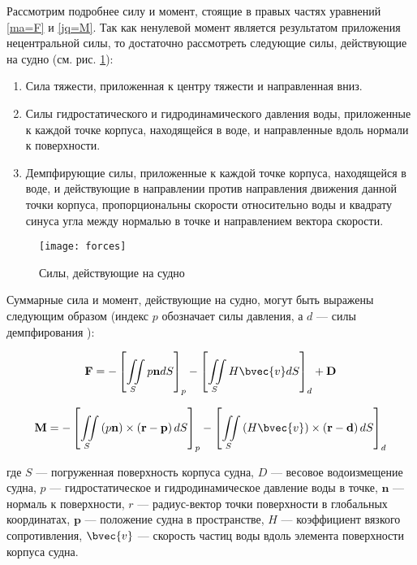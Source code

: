 Рассмотрим подробнее силу и момент, стоящие в правых частях уравнений \eqref{ma=F} и \eqref{jq=M}. 
Так как ненулевой момент является результатом приложения нецентральной силы, то достаточно рассмотреть следующие силы, действующие на судно (см. рис. \ref{boat_forces}):
\begin{enumerate}
	\item	Сила тяжести, приложенная к центру тяжести и 
			направленная вниз.
	\item	Силы гидростатического и гидродинамического давления воды, приложенные к каждой точке корпуса, 
			находящейся в воде, и направленные вдоль нормали к поверхности.
	\item	Демпфирующие силы, приложенные к каждой точке корпуса, 
			находящейся в воде, и действующие в направлении против 
			направления движения  данной точки корпуса, пропорциональны скорости 
			относительно воды и квадрату синуса угла между нормалью в точке и направлением 
			вектора скорости.
\end{enumerate}

\begin{figure}[ht]
\begin{center}
\texttt{[image: forces]}
\end{center}
\caption{Силы, действующие на судно}
\label{boat_forces}
\end{figure}

Суммарные сила и момент, действующие на судно, могут быть выражены следующим образом (индекс $p$ обозначает силы давления, а $d$ --- силы демпфирования ):

\begin{equation}
	\mathbf{F} = 
		-\left[ \iint\limits_{S} p \mathbf{n} dS 	\right]_{p}
		-\left[ \iint\limits_{S} H \bvec{v} dS 	\right]_{d}
		+ \mathbf{D}
	\label{F=integral}
\end{equation}

\begin{equation}
	\mathbf{M} = 
	-\left[ 
		\iint\limits_{S} 
		\left( p \mathbf{n} \right) \times 
		\left( \mathbf{r} - \mathbf{p} \right) dS	
	\right]_{p}
	-\left[ \iint\limits_{S} 
		\left( H \bvec{v} \right) \times 
		\left( \mathbf{r} - \mathbf{d} \right) dS	
	\right]_{d}
	\label{M=integral}
\end{equation}

где $S$ --- погруженная поверхность корпуса судна, $D$ --- весовое водоизмещение судна, $p$ --- гидростатическое и гидродинамическое давление воды в точке, $\mathbf{n}$ --- нормаль к поверхности, $r$ --- радиус-вектор точки поверхности в глобальных координатах, $\mathbf{p}$ --- положение судна в пространстве, $H$ --- коэффициент вязкого сопротивления, $\bvec{v}$ --- скорость частиц воды вдоль элемента поверхности корпуса судна.

